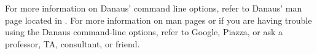 \documentclass{pset}
\begin{document}
For more information on Danaus' command line options, refer to Danaus' man page
located in . For more information on man pages or if you are
having trouble using the Danaus command-line options, refer to Google, Piazza,
or ask a professor, TA, consultant, or friend.
\fi

\ifx \ADVICE \undefined \else
\fi
\end{document}
